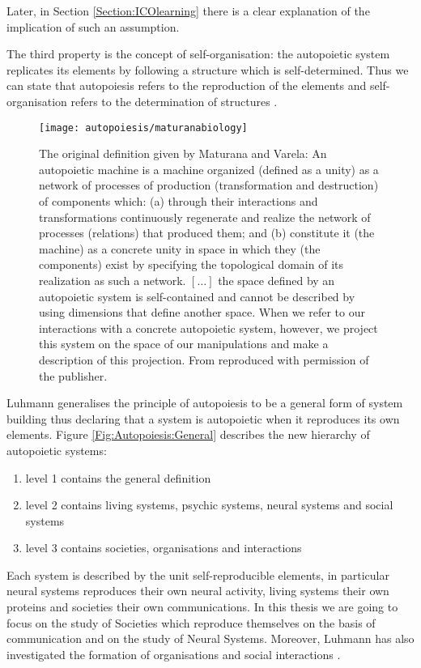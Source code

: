 Later, in Section \ref{Section:ICOlearning} there is a clear explanation of the
implication of such an assumption.

The third property is the concept of self-organisation: the autopoietic system replicates
its elements by following a structure which is self-determined.
Thus we can  state that autopoiesis refers to the reproduction of the elements
and self-organisation refers to the determination of structures \citep{Luhmann2000}.

\begin{figure}[htbp]
\begin{center}
\texttt{[image: autopoiesis/maturanabiology]}
\end{center}
\small{
\caption[Biological definition of autopoiesis]{The original definition given by Maturana and Varela:
An autopoietic machine is a machine organized (defined as a unity) as a network
of processes of production (transformation and destruction) of components which:
(a) through their interactions and transformations continuously regenerate and
realize the network of processes (relations) that produced them; and (b) constitute
 it (the machine) as a concrete unity in space in which they (the components)
exist by specifying the topological domain of its realization as such a network.
$[\dots]$ the space defined by an autopoietic system is self-contained and cannot be
described by using dimensions that define another space. When we refer to our
interactions with a concrete autopoietic system, however, we project this system
 on the space of our manipulations and make a description of this projection.
From \citet{Maturana1980} reproduced with permission of the publisher.
\label{Fig:Autopoiesis:System}}}
\end{figure}

Luhmann generalises the principle of autopoiesis to be a general form of system building
thus declaring that a system is autopoietic when it reproduces its own elements.
Figure \ref{Fig:Autopoiesis:General} describes the new hierarchy of autopoietic systems:
\begin{enumerate}
 \item level 1 contains the general definition
 \item level 2 contains living systems, psychic systems, neural systems and social systems
 \item level 3 contains societies, organisations and interactions
\end{enumerate}
Each system is described by the unit self-reproducible elements, in particular neural systems 
reproduces their own neural activity, living systems their own proteins and societies
 their own communications. 
In this thesis we are going to focus on the study of Societies \citep{Luhmann95}
which reproduce
themselves on the basis of communication and on the study of Neural Systems.
Moreover, Luhmann has also investigated the formation of organisations \citep{Luhmann2000} 
and social interactions \citep{Luhmann1993}.

